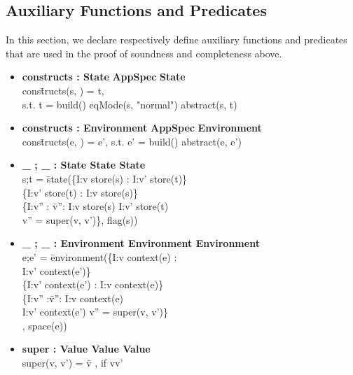 \documentclass[conference]{IEEEtran}
\begin{document}
\subsection{Auxiliary Functions and Predicates}\label{subsec:afp}
In this section, we declare respectively define auxiliary functions and predicates that are used in the proof of soundness and completeness above.
\begin{itemize}
\item \begin{tabbing}\textbf{constructs : State} \textbf{ AppSpec} \textbf{ State}
\\cons\=tructs(s, ) = t,
\\\> s.t. t = build()  eqMode(s, "normal")  abstract(s, t)
\end{tabbing}
\item \begin{tabbing}\textbf{constructs : Environment} \textbf{ AppSpec} \textbf{ Environment}
\\cons\=tructs(e, ) = e', s.t. e' = build()  abstract(e, e')
\end{tabbing}
\item \begin{tabbing}\textbf{\_ ; \_ : State  State  State}
\\ s;t = \=state(\{I:v  store(s) :  I:v'  store(t)\}  
\\\>\{I:v'  store(t) :  I:v  store(s)\} 
\\\>\{I:v'' : \= v'': I:v  store(s)  I:v'  store(t)  
\\\>\>v'' = super(v, v')\}, flag(s))
\end{tabbing}
\item \begin{tabbing}\textbf{\_ ; \_ : Environment  Environment  Environment}
\\ e;e' = \=environment(\{I:v  context(e) : 
\\\> I:v'  context(e')\}  
\\\>\{I:v'  context(e') :  I:v  context(e)\} 
\\\>\{I:v'' :\=  v'': I:v  context(e)  
\\\>\>I:v'  context(e')   v'' = super(v, v')\}
\\\>\>, space(e))
\end{tabbing}
\item \begin{tabbing}\textbf{super : Value  Value  Value}
\\super(v, v') = \= v	, if \textlbrackdbl v\textrbrackdbl  \textlbrackdbl v'\textrbrackdbl

\end{tabbing}
\end{itemize}
\end{document}
